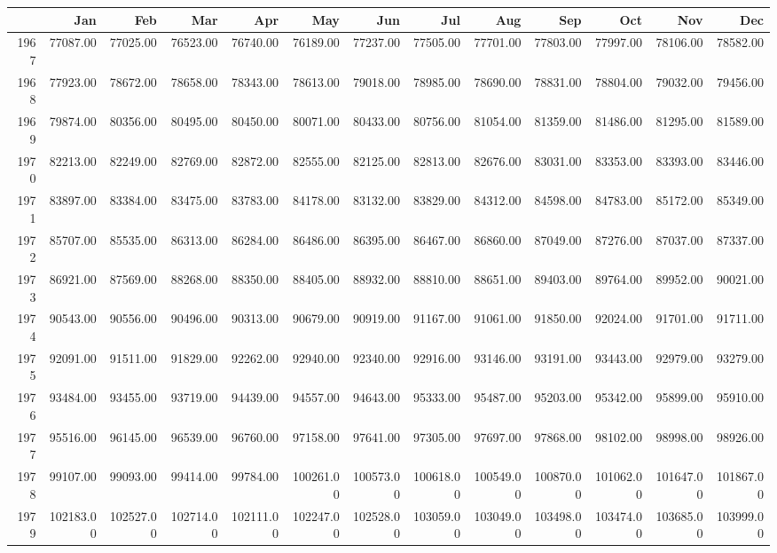 \begin{longtable}{rrrrrrrrrrrrr}
  \hline
 & Jan & Feb & Mar & Apr & May & Jun & Jul & Aug & Sep & Oct & Nov & Dec \\ 
  \hline
1967 & 77087.00 & 77025.00 & 76523.00 & 76740.00 & 76189.00 & 77237.00 & 77505.00 & 77701.00 & 77803.00 & 77997.00 & 78106.00 & 78582.00 \\ 
  1968 & 77923.00 & 78672.00 & 78658.00 & 78343.00 & 78613.00 & 79018.00 & 78985.00 & 78690.00 & 78831.00 & 78804.00 & 79032.00 & 79456.00 \\ 
  1969 & 79874.00 & 80356.00 & 80495.00 & 80450.00 & 80071.00 & 80433.00 & 80756.00 & 81054.00 & 81359.00 & 81486.00 & 81295.00 & 81589.00 \\ 
  1970 & 82213.00 & 82249.00 & 82769.00 & 82872.00 & 82555.00 & 82125.00 & 82813.00 & 82676.00 & 83031.00 & 83353.00 & 83393.00 & 83446.00 \\ 
  1971 & 83897.00 & 83384.00 & 83475.00 & 83783.00 & 84178.00 & 83132.00 & 83829.00 & 84312.00 & 84598.00 & 84783.00 & 85172.00 & 85349.00 \\ 
  1972 & 85707.00 & 85535.00 & 86313.00 & 86284.00 & 86486.00 & 86395.00 & 86467.00 & 86860.00 & 87049.00 & 87276.00 & 87037.00 & 87337.00 \\ 
  1973 & 86921.00 & 87569.00 & 88268.00 & 88350.00 & 88405.00 & 88932.00 & 88810.00 & 88651.00 & 89403.00 & 89764.00 & 89952.00 & 90021.00 \\ 
  1974 & 90543.00 & 90556.00 & 90496.00 & 90313.00 & 90679.00 & 90919.00 & 91167.00 & 91061.00 & 91850.00 & 92024.00 & 91701.00 & 91711.00 \\ 
  1975 & 92091.00 & 91511.00 & 91829.00 & 92262.00 & 92940.00 & 92340.00 & 92916.00 & 93146.00 & 93191.00 & 93443.00 & 92979.00 & 93279.00 \\ 
  1976 & 93484.00 & 93455.00 & 93719.00 & 94439.00 & 94557.00 & 94643.00 & 95333.00 & 95487.00 & 95203.00 & 95342.00 & 95899.00 & 95910.00 \\ 
  1977 & 95516.00 & 96145.00 & 96539.00 & 96760.00 & 97158.00 & 97641.00 & 97305.00 & 97697.00 & 97868.00 & 98102.00 & 98998.00 & 98926.00 \\ 
  1978 & 99107.00 & 99093.00 & 99414.00 & 99784.00 & 100261.00 & 100573.00 & 100618.00 & 100549.00 & 100870.00 & 101062.00 & 101647.00 & 101867.00 \\ 
  1979 & 102183.00 & 102527.00 & 102714.00 & 102111.00 & 102247.00 & 102528.00 & 103059.00 & 103049.00 & 103498.00 & 103474.00 & 103685.00 & 103999.00 \\ 

\end{longtable}
